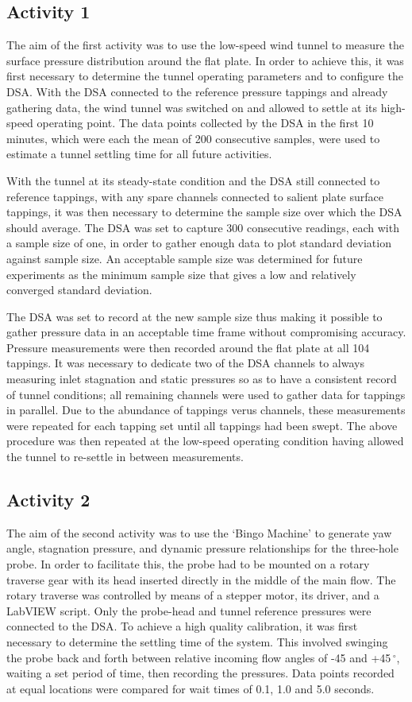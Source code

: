 \documentclass[11pt,a4paper,twocolumn]{article}
\begin{document}
\subsection{Activity 1}
The aim of the first activity was to use the low-speed wind tunnel to measure the surface pressure distribution around the flat plate. In order to achieve this, it was first necessary to determine the tunnel operating parameters and to configure the DSA. With the DSA connected to the reference pressure tappings and already gathering data, the wind tunnel was switched on and allowed to settle at its high-speed operating point. The data points collected by the DSA in the first 10 minutes, which were each the mean of 200 consecutive samples, were used to estimate a tunnel settling time for all future activities.

With the tunnel at its steady-state condition and the DSA still connected to reference tappings, with any spare channels connected to salient plate surface tappings, it was then necessary to determine the sample size over which the DSA should average. The DSA was set to capture 300 consecutive readings, each with a sample size of one, in order to gather enough data to plot standard deviation against sample size. An acceptable sample size was determined for future experiments as the minimum sample size that gives a low and relatively converged standard deviation.

The DSA was set to record at the new sample size thus making it possible to gather pressure data in an acceptable time frame without compromising accuracy. Pressure measurements were then recorded around the flat plate at all 104 tappings. It was necessary to dedicate two of the DSA channels to always measuring inlet stagnation and static pressures so as to have a consistent record of tunnel conditions; all remaining channels were used to gather data for tappings in parallel. Due to the abundance of tappings verus channels, these measurements were repeated for each tapping set until all tappings had been swept. The above procedure was then repeated at the low-speed operating condition having allowed the tunnel to re-settle in between measurements.

\subsection{Activity 2}
The aim of the second activity was to use the ‘Bingo Machine’ to generate yaw angle, stagnation pressure, and dynamic pressure relationships for the three-hole probe. In order to facilitate this, the probe had to be mounted on a rotary traverse gear with its head inserted directly in the middle of the main flow. The rotary traverse was controlled by means of a stepper motor, its driver, and a LabVIEW script. Only the probe-head and tunnel reference pressures were connected to the DSA. To achieve a high quality calibration, it was first necessary to determine the settling time of the system. This involved swinging the probe back and forth between relative incoming flow angles of -45 and +45\,$^\circ$, waiting a set period of time, then recording the pressures. Data points recorded at equal locations were compared for wait times of 0.1, 1.0 and 5.0 seconds. 
\end{document}
